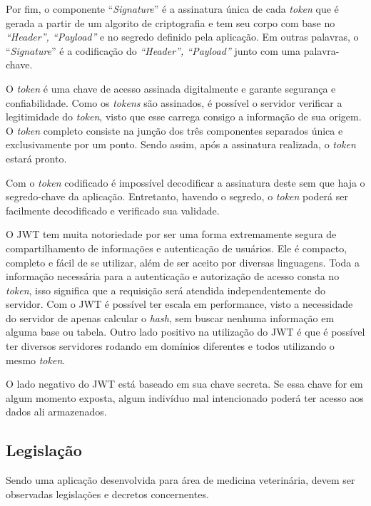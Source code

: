 \documentclass[
    12pt,               %
    openright,          %
    oneside,
    a4paper,            %
    BIBLATEX,           %
    TODO,               %
    english,            %
    brazil              %
    ]{ifsp-spo-inf-ctds}
\begin{document}
            Por fim, o componente “\emph{Signature}” é a assinatura única de cada \emph{token} que é gerada a partir de um algorito de criptografia e tem seu corpo com base no \emph{“Header”, “Payload”} e no segredo definido pela aplicação. Em outras palavras, o “\emph{Signature}” é a codificação do \emph{“Header”, “Payload”} junto com uma palavra-chave.
            
            O \emph{token} é uma chave de acesso assinada digitalmente e garante segurança e confiabilidade. Como os \emph{tokens} são assinados, é possível o servidor verificar a legitimidade do \emph{token}, visto que esse carrega consigo a informação de sua origem. O \emph{token} completo consiste na junção dos três componentes separados única e exclusivamente por um ponto. Sendo assim, após a assinatura realizada, o  \emph{token} estará pronto. 
            
            Com o \emph{token} codificado é impossível decodificar a assinatura deste sem que haja o segredo-chave da aplicação. Entretanto, havendo o segredo, o \emph{token} poderá ser facilmente decodificado e verificado sua validade. 
            
            O JWT tem muita notoriedade por ser uma forma extremamente segura de compartilhamento de informações e autenticação de usuários. Ele é compacto, completo e fácil de se utilizar, além de ser aceito por diversas linguagens. Toda a informação necessária para a autenticação e autorização de acesso consta no \emph{token}, isso significa que a requisição será atendida independentemente do servidor. Com o JWT é possível ter escala em performance, visto a necessidade do servidor de apenas calcular o \emph{hash}, sem buscar nenhuma informação em alguma base ou tabela. Outro lado positivo na utilização do JWT é que é possível ter diversos servidores rodando em domínios diferentes e todos utilizando o mesmo \emph{token}.
            
            O lado negativo do JWT está baseado em sua chave secreta. Se essa chave for em algum momento exposta, algum indivíduo mal intencionado poderá ter acesso aos dados ali armazenados.


        \subsection{Legislação}
        
            Sendo uma aplicação desenvolvida para área de medicina veterinária, devem ser observadas legislações e decretos concernentes.
        
\end{document}
